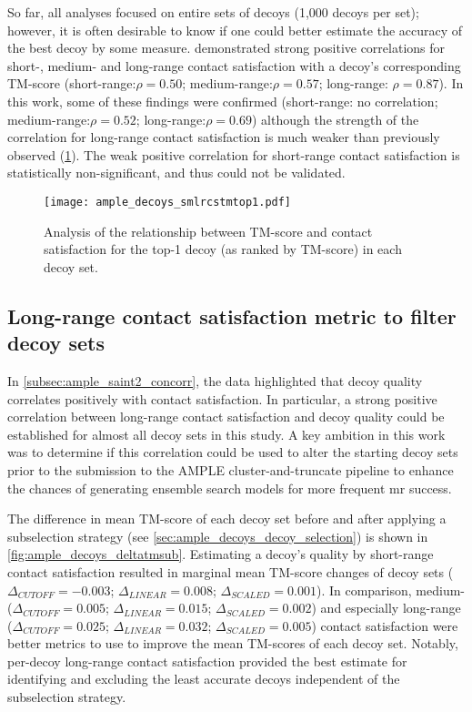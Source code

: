 So far, all analyses focused on entire sets of decoys (1,000 decoys per set); however, it is often desirable to know if one could better estimate the accuracy of the best decoy by some measure. \textcite{Kosciolek2014-bt} demonstrated strong positive correlations for short-, medium- and long-range contact satisfaction with a decoy's corresponding TM-score (short-range:$\rho=0.50$; medium-range:$\rho=0.57$; long-range: $\rho=0.87$). In this work, some of these findings were confirmed (short-range: no correlation; medium-range:$\rho=0.52$; long-range:$\rho=0.69$) although the strength of the correlation for long-range contact satisfaction is much weaker than previously observed (\cref{fig:ample_decoys_smlrcstmtop1}). The weak positive correlation for short-range contact satisfaction is statistically non-significant, and thus could not be validated. 

\begin{figure}[H]
	\centering
        \texttt{[image: ample\_decoys\_smlrcstmtop1.pdf]}
        \caption[Top-1 decoy TM-score and contact satisfaction analysis]{Analysis of the relationship between TM-score and contact satisfaction for the top-1 decoy (as ranked by TM-score) in each decoy set.}
	\label{fig:ample_decoys_smlrcstmtop1}
\end{figure}

\subsection{Long-range contact satisfaction metric to filter decoy sets}
In \cref{subsec:ample_saint2_concorr}, the data highlighted that decoy quality correlates positively with contact satisfaction. In particular, a strong positive correlation between long-range contact satisfaction and decoy quality could be established for almost all decoy sets in this study. A key ambition in this work was to determine if this correlation could be used to alter the starting decoy sets prior to the submission to the AMPLE cluster-and-truncate pipeline to enhance the chances of generating ensemble search models for more frequent \gls{mr} success.

The difference in mean TM-score of each decoy set before and after applying a subselection strategy (see \cref{sec:ample_decoys_decoy_selection}) is shown in \cref{fig:ample_decoys_deltatmsub}. Estimating a decoy's quality by short-range contact satisfaction resulted in marginal mean TM-score changes of decoy sets ($\Delta_{CUTOFF}=-0.003$; $\Delta_{LINEAR}=0.008$; $\Delta_{SCALED}=0.001$). In comparison, medium- ($\Delta_{CUTOFF}=0.005$; $\Delta_{LINEAR}=0.015$; $\Delta_{SCALED}=0.002$) and especially long-range ($\Delta_{CUTOFF}=0.025$; $\Delta_{LINEAR}=0.032$; $\Delta_{SCALED}=0.005$) contact satisfaction were better metrics to use to improve the mean TM-scores of each decoy set. Notably, per-decoy long-range contact satisfaction provided the best estimate for identifying and excluding the least accurate decoys independent of the subselection strategy. 

